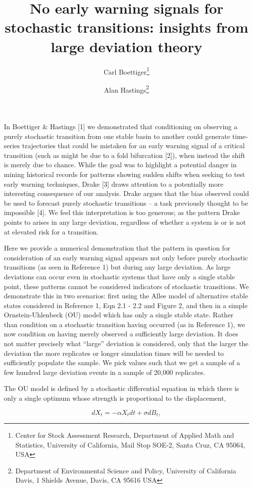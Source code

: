 \documentclass{article}
\title{No early warning signals for stochastic transitions: insights from large
       deviation theory}
\author{%
  Carl Boettiger\thanks{Center for Stock Assessment Research, Department of Applied Math and Statistics, University of California, Mail Stop SOE-2, Santa Cruz, CA 95064, USA} \and Alan Hastings\thanks{Department of Environmental Science and Policy, University of California Davis, 1 Shields Avenue, Davis, CA 95616 USA}}
\begin{document}
  
\maketitle


In Boettiger \& Hastings {[}1{]} we demonstrated that conditioning on
observing a purely stochastic transition from one stable basin to
another could generate time-series trajectories that could be mistaken
for an early warning signal of a critical transition (such as might be
due to a fold bifurcation {[}2{]}), when instead the shift is merely due
to chance. While the goal was to highlight a potential danger in mining
historical records for patterns showing sudden shifts when seeking to
test early warning techniques, Drake {[}3{]} draws attention to a
potentially more interesting consequence of our analysis. Drake argues
that the bias observed could be used to forecast purely stochastic
transitions -- a task previously thought to be impossible {[}4{]}. We
feel this interpretation is too generous; as the pattern Drake points to
arises in any large deviation, regardless of whether a system is or is
not at elevated risk for a transition.

Here we provide a numerical demonstration that the pattern in question
for consideration of an early warning signal appears not only before
purely stochastic transitions (as seen in Reference 1) but during any
large deviation. As large deviations can occur even in stochastic
systems that have only a single stable point, these patterns cannot be
considered indicators of stochastic transitions. We demonstrate this in
two scenarios: first using the Allee model of alternative stable states
considered in Reference 1, Eqn 2.1 - 2.2 and Figure 2, and then in a
simple Ornstein-Uhlenbeck (OU) model which has only a single stable
state. Rather than condition on a stochastic transition having occurred
(as in Reference 1), we now condition on having merely observed a
sufficiently large deviation. It does not matter precisely what
``large'' deviation is considered, only that the larger the deviation
the more replicates or longer simulation times will be needed to
sufficiently populate the sample. We pick values such that we get a
sample of a few hundred large deviation events in a sample of 20,000
replicates.

The OU model is defined by a stochastic differential equation in which
there is only a single optimum whose strength is proportional to the
displacement,

\[ dX_t = - \alpha X_t dt + \sigma dB_t, \]
\end{document}
